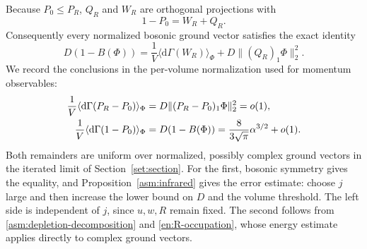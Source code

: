 Because $P_0\le P_R$, $Q_R$ and $W_R$ are orthogonal projections with
\begin{equation}\label{asm:orthogonal-decomposition}
 1-P_0=W_R+Q_R.
\end{equation}
Consequently every normalized bosonic ground vector satisfies the exact
identity
\begin{equation}\label{asm:depletion-decomposition}
 D(1-B(\Phi))=
        \frac1V\langle\mathrm d\Gamma(W_R)\rangle_\Phi
                   +D\|(Q_R)_1\Phi\|_2^2.
\end{equation}
We record the conclusions in the per-volume normalization used for
momentum observables:
\begin{align}
 \frac1V\langle\mathrm d\Gamma(P_R-P_0)\rangle_\Phi
   &=D\|(P_R-P_0)_1\Phi\|_2^2=o(1),
       \label{asm:coarse-density}\\
 \frac1V\langle\mathrm d\Gamma(1-P_0)\rangle_\Phi
   &=D(1-B(\Phi))=\frac{8}{3\sqrt\pi}\alpha^{3/2}+o(1).
       \label{asm:scaled-depletion}
\end{align}
Both remainders are uniform over normalized, possibly complex ground
vectors in the iterated limit of Section~\ref{set:section}. For the first,
bosonic symmetry gives the equality, and Proposition~\ref{asm:infrared}
gives the error estimate: choose $j$ large and then increase the lower
bound on $D$ and the volume threshold. The left side is independent of
$j$, since $u,w,R$ remain fixed. The second follows from
\eqref{asm:depletion-decomposition} and \eqref{en:R-occupation}, whose
energy estimate applies directly to complex ground vectors.
